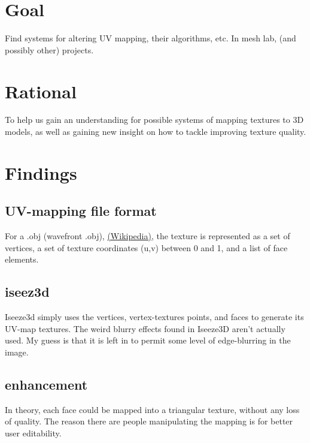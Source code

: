 

\usepackage{hyperref}




\section{Goal}

Find systems for altering UV mapping, their algorithms, etc. In mesh lab, (and possibly other) projects.

\section{Rational}

To help us gain an understanding for possible systems of mapping textures to 3D models, as well as gaining new insight on how to tackle improving texture quality.

\section{Findings}

\subsection{UV-mapping file format}
For a .obj (wavefront .obj), \href{https://en.wikipedia.org/wiki/Wavefront_.obj_file}{(Wikipedia)}, the texture is represented as a set of vertices, a set of texture coordinates (u,v) between 0 and 1, and a list of face elements.

\subsection{iseez3d}
Iseeze3d simply uses the vertices, vertex-textures points, and faces to generate its UV-map textures. The weird blurry effects found in Iseeze3D aren't actually used. My guess is that it is left in to permit some level of edge-blurring in the image.

\subsection{enhancement}
In theory, each face could be mapped into a triangular texture, without any loss of quality. The reason there are people manipulating the mapping is for better user editability.

 

